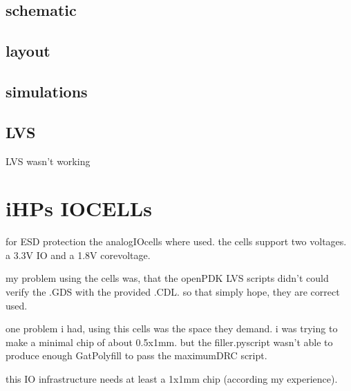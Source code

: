 \documentclass[letterpaper,10pt,english]{sphinxmanual}
\begin{document}
\section{schematic}
\label{\detokenize{regulators:schematic}}


\section{layout}
\label{\detokenize{regulators:layout}}


\section{simulations}
\label{\detokenize{regulators:simulations}}
\sphinxAtStartPar
{}


\section{LVS}
\label{\detokenize{regulators:lvs}}
\sphinxAtStartPar
LVS wasn’t working

\sphinxstepscope


\chapter{iHPs IO\sphinxhyphen{}CELLs}
\label{\detokenize{io:ihps-io-cells}}\label{\detokenize{io::doc}}
\sphinxAtStartPar
for ESD protection the analog\sphinxhyphen{}IO\sphinxhyphen{}cells where used. the cells support two voltages. a 3.3V IO and a 1.8V core\sphinxhyphen{}voltage.

\sphinxAtStartPar
my problem using the cells was, that the openPDK LVS scripts didn’t could verify the .GDS with the provided .CDL. so that simply hope, they are correct used.

\sphinxAtStartPar
one problem i had, using this cells was the space they demand. i was trying to make a minimal chip of about 0.5x1mm. but the filler.py\sphinxhyphen{}script wasn’t able to produce enough GatPoly\sphinxhyphen{}fill to pass the maximum\sphinxhyphen{}DRC script.

\sphinxAtStartPar
this IO infrastructure needs at least a 1x1mm chip (according my experience).
\end{document}
